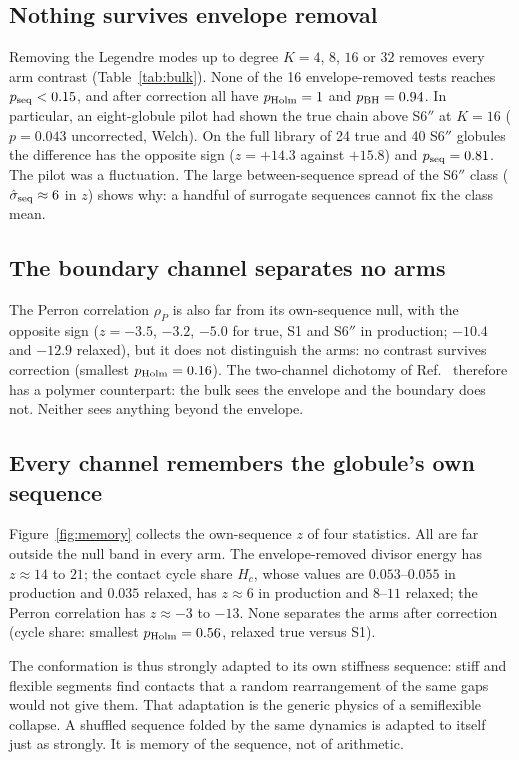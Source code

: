 \documentclass[reprint,amsmath,amssymb,aps,pre,longbibliography]{revtex4-2}
\begin{document}
\subsection{Nothing survives envelope removal}
Removing the Legendre modes up to degree $K=4$, $8$, $16$ or $32$ removes every arm contrast
(Table~\ref{tab:bulk}). None of the 16 envelope-removed tests reaches $p_{\rm seq}<0.15$, and after
correction all have $p_{\rm Holm}=1$ and $p_{\rm BH}=0.94$. In particular, an eight-globule pilot had
shown the true chain above S6$''$ at $K=16$ ($p=0.043$ uncorrected, Welch). On the full library of 24
true and 40 S6$''$ globules the difference has the opposite sign ($z=+14.3$ against $+15.8$) and
$p_{\rm seq}=0.81$. The pilot was a fluctuation. The large between-sequence spread of the S6$''$
class ($\hat\sigma_{\rm seq}\approx6$ in $z$) shows why: a handful of surrogate sequences cannot
fix the class mean.

\subsection{The boundary channel separates no arms}
The Perron correlation $\rho_P$ is also far from its own-sequence null, with the opposite sign
($z=-3.5$, $-3.2$, $-5.0$ for true, S1 and S6$''$ in production; $-10.4$ and $-12.9$ relaxed), but
it does not distinguish the arms: no contrast survives correction (smallest $p_{\rm Holm}=0.16$).
The two-channel dichotomy of Ref.~\cite{ANCCFT} therefore has a polymer counterpart: the bulk sees
the envelope and the boundary does not. Neither sees anything beyond the envelope.

\subsection{Every channel remembers the globule's own sequence}
Figure~\ref{fig:memory} collects the own-sequence $z$ of four statistics. All are far outside the
null band in every arm. The envelope-removed divisor energy has $z\approx14$ to $21$; the contact
cycle share $H_c$, whose values are $0.053$--$0.055$ in production and $0.035$ relaxed, has
$z\approx6$ in production and $8$--$11$ relaxed; the Perron correlation has $z\approx-3$ to $-13$.
None separates the arms after correction (cycle share: smallest $p_{\rm Holm}=0.56$, relaxed true
versus S1).

The conformation is thus strongly adapted to its own stiffness sequence: stiff and flexible
segments find contacts that a random rearrangement of the same gaps would not give them. That
adaptation is the generic physics of a semiflexible collapse. A shuffled sequence folded by the
same dynamics is adapted to itself just as strongly. It is memory of the sequence, not of
arithmetic.
\end{document}
